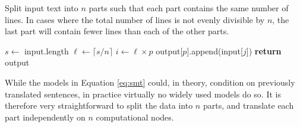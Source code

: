 \documentclass{pbml}
\begin{document}
\begin{algorithm}
\caption{Split input text into $n$ parts such that each part contains the same number of lines. In cases where the total number of lines is not evenly divisible by $n$, the last part will contain fewer lines than each of the other parts.}
\begin{algorithmic}
\State $s \gets $ input.length
\State $\ell \gets \lceil s / n\rceil$
\State $i \gets \ell \times p$
\State output[$p$].append(input[$j$])
\EndFor
\EndFor
\State \textbf{return} output
\EndFunction
\end{algorithmic}
\label{alg:naive}
\end{algorithm}

While the models in Equation \ref{eq:smt} could, in theory, condition on previously translated sentences, in practice virtually no widely used models do so. It is therefore very straightforward to split the data into $n$ parts, and translate each part independently on $n$ computational nodes. 





\end{document}
